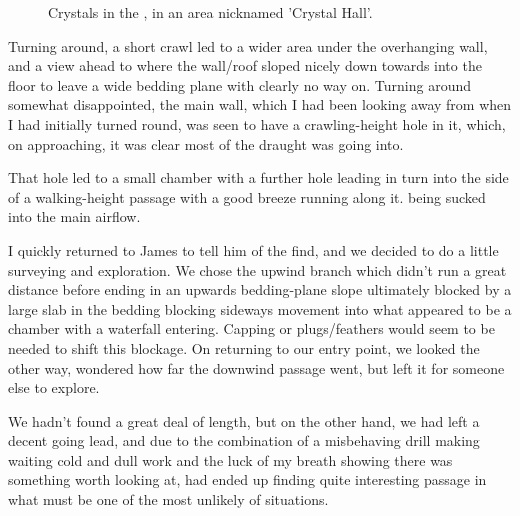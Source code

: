 \begin{figure}[t!]
\checkoddpage \ifoddpage \forcerectofloat \else \forceversofloat \fi
{}
\caption{Crystals in the \protect{}, in an area nicknamed 'Crystal Hall'. }
\end{figure}


Turning around, a short crawl led to a wider area under the overhanging
wall, and a view ahead to where the wall/roof sloped nicely down towards
into the floor to leave a wide bedding plane with clearly no way on.
Turning around somewhat disappointed, the main wall, which I had been
looking away from when I had initially turned round, was seen to have a
crawling-height hole in it, which, on approaching, it was clear most of
the draught was going into.

That hole led to a small chamber with a further hole leading in turn
into the side of a walking-height passage with a good breeze running
along it.  being sucked into the main airflow.

I quickly returned to James to tell him of the find, and we decided to
do a little surveying and exploration. We chose the upwind branch which
didn't run a great distance before ending in an upwards bedding-plane
slope ultimately blocked by a large slab in the bedding blocking
sideways movement into what appeared to be a chamber with a waterfall
entering. Capping or plugs/feathers would seem to be needed to shift
this blockage. On returning to our entry point, we looked the other way,
wondered how far the downwind passage went, but left it for someone else
to explore.

We hadn't found a great deal of length, but on the other hand, we had
left a decent going lead, and due to the combination of a misbehaving
drill making waiting cold and dull work and the luck of my breath
showing there was something worth looking at, had ended up finding quite
interesting passage in what must be one of the most unlikely of
situations.


